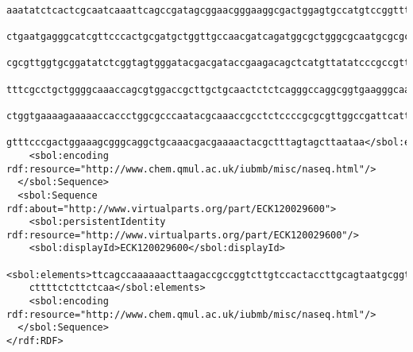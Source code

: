 \begin{lstlisting}
    aaatatctcactcgcaatcaaattcagccgatagcggaacgggaaggcgactggagtgccatgtccggttttcaacaaaccatgcaaatg
    ctgaatgagggcatcgttcccactgcgatgctggttgccaacgatcagatggcgctgggcgcaatgcgcgccattaccgagtccgggctg
    cgcgttggtgcggatatctcggtagtgggatacgacgataccgaagacagctcatgttatatcccgccgttaaccaccatcaaacaggat
    tttcgcctgctggggcaaaccagcgtggaccgcttgctgcaactctctcagggccaggcggtgaagggcaatcagctgttgcccgtctca
    ctggtgaaaagaaaaaccaccctggcgcccaatacgcaaaccgcctctccccgcgcgttggccgattcattaatgcagctggcacgacag
    gtttcccgactggaaagcgggcaggctgcaaacgacgaaaactacgctttagtagcttaataa</sbol:elements>
    <sbol:encoding rdf:resource="http://www.chem.qmul.ac.uk/iubmb/misc/naseq.html"/>
  </sbol:Sequence>
  <sbol:Sequence rdf:about="http://www.virtualparts.org/part/ECK120029600">
    <sbol:persistentIdentity rdf:resource="http://www.virtualparts.org/part/ECK120029600"/>
    <sbol:displayId>ECK120029600</sbol:displayId>
    <sbol:elements>ttcagccaaaaaacttaagaccgccggtcttgtccactaccttgcagtaatgcggtggacaggatcggcggtttt
    cttttctcttctcaa</sbol:elements>
    <sbol:encoding rdf:resource="http://www.chem.qmul.ac.uk/iubmb/misc/naseq.html"/>
  </sbol:Sequence>
</rdf:RDF>

\end{lstlisting}
